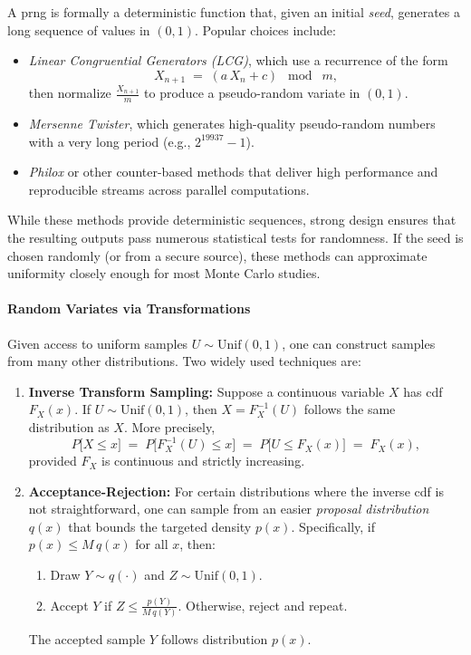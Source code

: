 A \acrshort{prng} is formally a deterministic function that, given an initial \emph{seed}, generates a long sequence of values in \((0,1)\). Popular choices include:
\begin{itemize}
\item \emph{Linear Congruential Generators (LCG)}, which use a recurrence of the form
\[
X_{n+1}
\;=\;
(a\,X_n + c)
\;\bmod\; m,
\]
then normalize \(\frac{X_{n+1}}{m}\) to produce a pseudo-random variate in \((0,1)\).
\item \emph{Mersenne Twister}, which generates high-quality pseudo-random numbers with a very long period (e.g., \(2^{19937}-1\)).
\item \emph{Philox} or other counter-based methods that deliver high performance and reproducible streams across parallel computations.
\end{itemize}

While these methods provide deterministic sequences, strong design ensures that the resulting outputs pass numerous statistical tests for randomness. If the seed is chosen randomly (or from a secure source), these methods can approximate uniformity closely enough for most Monte Carlo studies.

\paragraph{Random Variates via Transformations}
Given access to uniform samples \(U\sim \mathrm{Unif}(0,1)\), one can construct samples from many other distributions. Two widely used techniques are:

\begin{enumerate}
\item \textbf{Inverse Transform Sampling:}  
   Suppose a continuous variable \(X\) has \acrfull{cdf} \(F_X(x)\). If \(U\sim \mathrm{Unif}(0,1)\), then \(X=F_X^{-1}(U)\) follows the same distribution as \(X\). More precisely,
   \[
   P\bigl[X \le x\bigr]
   \;=\;
   P\bigl[F_X^{-1}(U)\le x\bigr]
   \;=\;
   P\bigl[U \le F_X(x)\bigr]
   \;=\;
   F_X(x),
   \]
   provided \(F_X\) is continuous and strictly increasing.  

\item \textbf{Acceptance-Rejection:}  
   For certain distributions where the inverse \acrshort{cdf} is not straightforward, one can sample from an easier \emph{proposal distribution} \(q(x)\) that bounds the targeted density \(p(x)\). Specifically, if \(p(x)\le M\,q(x)\) for all \(x\), then:
   \begin{enumerate}
   \item Draw \(Y\sim q(\cdot)\) and \(Z\sim \mathrm{Unif}(0,1)\).
   \item Accept \(Y\) if \(Z\le \frac{p(Y)}{M\,q(Y)}\). Otherwise, reject and repeat.
   \end{enumerate}
   The accepted sample \(Y\) follows distribution \(p(x)\).  
\end{enumerate}

